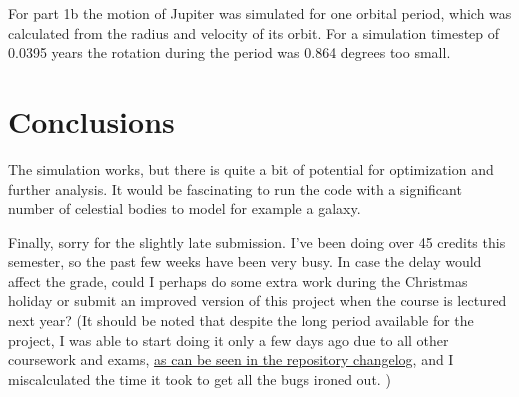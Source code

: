 \documentclass[a4paper]{article}
\begin{document}
For part 1b the motion of Jupiter was simulated for one orbital period, which was calculated from the radius and velocity of its orbit.
For a simulation timestep of 0.0395 years the rotation during the period was 0.864 degrees too small.


\FloatBarrier
\section{Conclusions}
The simulation works, but there is quite a bit of potential for optimization and further analysis.
It would be fascinating to run the code with a significant number of celestial bodies to model for example a galaxy.

Finally, sorry for the slightly late submission.
I've been doing over 45 credits this semester, so the past few weeks have been very busy.
In case the delay would affect the grade, could I perhaps do
some extra work during the Christmas holiday or submit an improved version of this project
when the course is lectured next year?
(It should be noted that despite the long period available for the project, I was able to start doing it only
a few days ago due to all other coursework and exams,
\href{https://github.com/AgenttiX/planetary-motion/commits/main}{as can be seen in the repository changelog},
and I miscalculated the time it took to get all the bugs ironed out.
)
\end{document}
